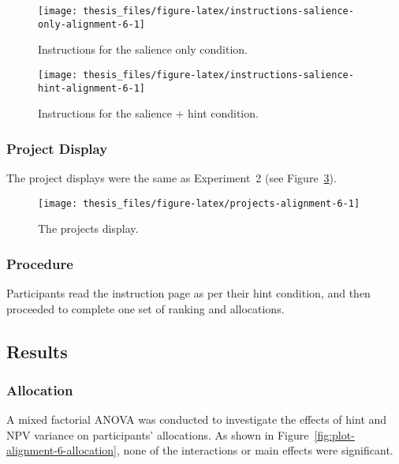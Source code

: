 \documentclass[a4paper, nobind]{templates/ociamthesis}
\theoremstyle{definition}
\theoremstyle{definition}
\theoremstyle{definition}
\theoremstyle{definition}
\theoremstyle{remark}
\begin{document}
\begin{figure}
\texttt{[image: thesis\_files/figure-latex/instructions-salience-only-alignment-6-1]} \caption{Instructions for the salience only condition.}\label{fig:instructions-salience-only-alignment-6}
\end{figure}



\begin{figure}
\texttt{[image: thesis\_files/figure-latex/instructions-salience-hint-alignment-6-1]} \caption{Instructions for the salience + hint condition.}\label{fig:instructions-salience-hint-alignment-6}
\end{figure}

\subsubsection{Project Display}

The project displays were the same as Experiment~2 (see
Figure~\ref{fig:projects-alignment-6}).



\begin{figure}
\texttt{[image: thesis\_files/figure-latex/projects-alignment-6-1]} \caption{The projects display.}\label{fig:projects-alignment-6}
\end{figure}

\subsubsection{Procedure}

Participants read the instruction page as per their hint condition, and then
proceeded to complete one set of ranking and allocations.

\subsection{Results}

\subsubsection{Allocation}

A mixed factorial ANOVA was conducted to investigate the effects of hint
and NPV variance on participants' allocations. As shown in
Figure~\ref{fig:plot-alignment-6-allocation}, none of the interactions or main
effects were significant.
\end{document}
